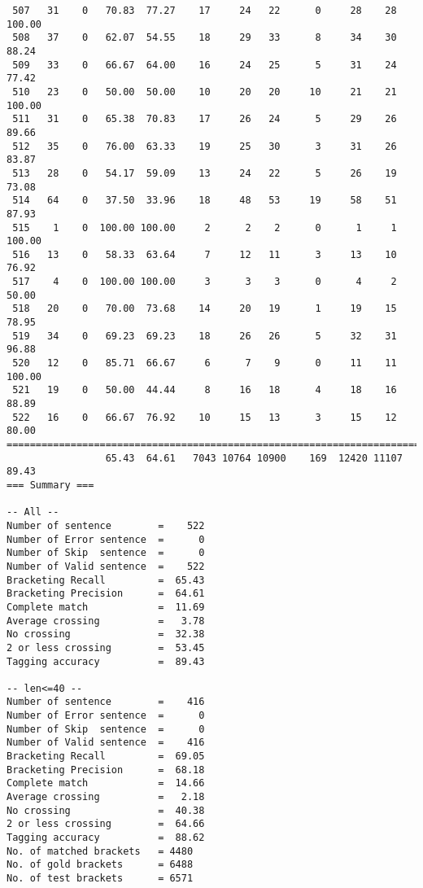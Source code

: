 \begin{verbatim}
 507   31    0   70.83  77.27    17     24   22      0     28    28   100.00
 508   37    0   62.07  54.55    18     29   33      8     34    30    88.24
 509   33    0   66.67  64.00    16     24   25      5     31    24    77.42
 510   23    0   50.00  50.00    10     20   20     10     21    21   100.00
 511   31    0   65.38  70.83    17     26   24      5     29    26    89.66
 512   35    0   76.00  63.33    19     25   30      3     31    26    83.87
 513   28    0   54.17  59.09    13     24   22      5     26    19    73.08
 514   64    0   37.50  33.96    18     48   53     19     58    51    87.93
 515    1    0  100.00 100.00     2      2    2      0      1     1   100.00
 516   13    0   58.33  63.64     7     12   11      3     13    10    76.92
 517    4    0  100.00 100.00     3      3    3      0      4     2    50.00
 518   20    0   70.00  73.68    14     20   19      1     19    15    78.95
 519   34    0   69.23  69.23    18     26   26      5     32    31    96.88
 520   12    0   85.71  66.67     6      7    9      0     11    11   100.00
 521   19    0   50.00  44.44     8     16   18      4     18    16    88.89
 522   16    0   66.67  76.92    10     15   13      3     15    12    80.00
============================================================================
                 65.43  64.61   7043 10764 10900    169  12420 11107    89.43
=== Summary ===

-- All --
Number of sentence        =    522
Number of Error sentence  =      0
Number of Skip  sentence  =      0
Number of Valid sentence  =    522
Bracketing Recall         =  65.43
Bracketing Precision      =  64.61
Complete match            =  11.69
Average crossing          =   3.78
No crossing               =  32.38
2 or less crossing        =  53.45
Tagging accuracy          =  89.43

-- len<=40 --
Number of sentence        =    416
Number of Error sentence  =      0
Number of Skip  sentence  =      0
Number of Valid sentence  =    416
Bracketing Recall         =  69.05
Bracketing Precision      =  68.18
Complete match            =  14.66
Average crossing          =   2.18
No crossing               =  40.38
2 or less crossing        =  64.66
Tagging accuracy          =  88.62
No. of matched brackets   = 4480
No. of gold brackets      = 6488
No. of test brackets      = 6571

\end{verbatim}

\normalsize


